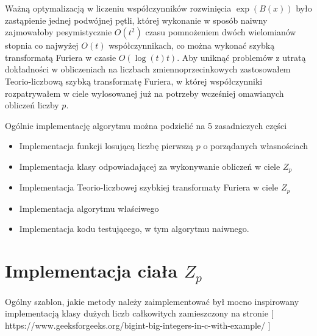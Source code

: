 \documentclass{article}
\begin{document}

Ważną optymalizacją w liczeniu współczynników rozwinięcia $\exp(B(x))$ było zastąpienie jednej podwójnej pętli, 
której wykonanie w sposób naiwny zajmowałoby pesymistycznie $O(t^2)$ czasu pomnożeniem dwóch wielomianów stopnia co 
najwyżej $O(t)$ współczynnikach, co można wykonać szybką 
transformatą Furiera w czasie $O(\log(t)t)$. Aby uniknąć problemów z utratą dokładności w obliczeniach na liczbach 
zmiennoprzecinkowych zastosowałem Teorio-liczbową szybką transformatę Furiera, w której współczynniki rozpatrywałem w ciele 
wylosowanej już na potrzeby wcześniej omawianych obliczeń 
liczby $p$.

Ogólnie implementację algorytmu można podzielić na 5 zasadniczych części
\begin{itemize}
  \item Implementacja funkcji losującą liczbę pierwszą $p$ o porządanych własnościach
  \item Implementacja klasy odpowiadającej za wykonywanie obliczeń w ciele $Z_p$
  \item Implementacja Teorio-liczbowej szybkiej transformaty Furiera w ciele $Z_p$
  \item Implementacja algorytmu właściwego
  \item Implementacja kodu testującego, w tym algorytmu naiwnego.
\end{itemize}




\section{Implementacja ciała $Z_p$}

Ogólny szablon, jakie metody należy zaimplementować był 
mocno inspirowany implementacją klasy dużych liczb całkowitych
zamieszczony na stronie [ https://www.geeksforgeeks.org/bigint-big-integers-in-c-with-example/ ]
\end{document}
